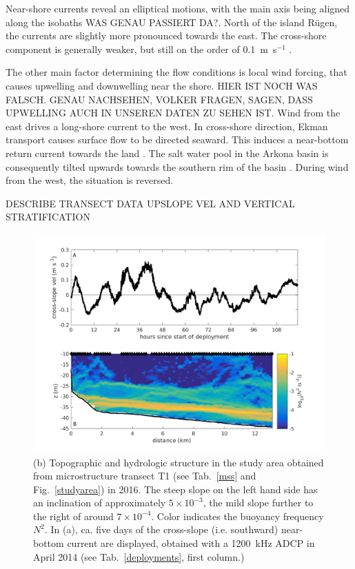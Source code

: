 Near-shore currents reveal an elliptical motions, with the main axis 
being aligned along the isobaths \citep[][]{lass2003} WAS GENAU PASSIERT DA?. 
North of the island 
R\"{u}gen, the currents are slightly more pronounced towards the east. The 
cross-shore component is generally weaker, but still on the order of 
0.1~m~s$^{-1}$ \citep[][]{lass1993}. 

The other main factor determining the flow conditions is local wind forcing, 
that causes upwelling and downwelling near the shore. HIER IST NOCH WAS 
FALSCH. GENAU NACHSEHEN, VOLKER FRAGEN, SAGEN, DASS UPWELLING AUCH IN 
UNSEREN DATEN ZU SEHEN IST. Wind from the east drives 
a long-shore current to the west. In cross-shore direction, Ekman 
transport causes surface flow to be directed seaward. This induces a 
near-bottom return current towards the land \citep[][]{lass1993}. The salt 
water pool in the Arkona basin is consequently tilted upwards towards the 
southern rim of the basin \citep[][]{lass2003}. During wind from the west, the 
situation is reversed.

DESCRIBE TRANSECT DATA UPSLOPE VEL AND VERTICAL STRATIFICATION 

  \begin{figure}[ht]
\includegraphics[width=40pc]{bilder/abslope.png}
 \caption{(b) Topographic and hydrologic structure in the study area 
obtained from microstructure transect T1 (see Tab.\ \ref{mss} and Fig.\ 
\ref{studyarea}) in 2016. The steep slope on the left hand side has an 
inclination of approximately $5 \times 10^{-3}$, the mild slope further to the 
right of around $7 \times 10^{-4}$. Color indicates the buoyancy frequency 
$N^2$. In (a), ca. five days of the cross-slope (i.e. southward) near-bottom 
current are displayed, obtained with a 1200~kHz ADCP in April 2014 (see Tab.\ 
\ref{deployments}, first column.)}
 \label{abslope}
 \end{figure}

